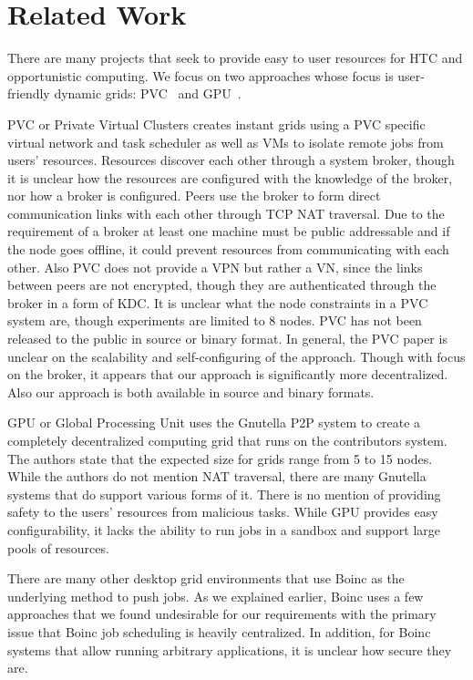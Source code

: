 \documentclass{sig-alternate}
\begin{document}
\section{Related Work}
\label{related_work}
There are many projects that seek to provide easy to user resources for HTC
and opportunistic computing.  We focus on two approaches whose focus is
user-friendly dynamic grids: PVC~\cite{pvc} and GPU~\cite{gpu}.

PVC or Private Virtual Clusters creates instant grids using a
PVC specific virtual network and task scheduler as well as VMs to isolate
remote jobs from users' resources.  Resources discover each other through a
system broker, though it is unclear how the resources are configured with the
knowledge of the broker, nor how a broker is configured.  Peers use the broker
to form direct communication links with each other through TCP NAT traversal.
Due to the requirement of a broker at least one machine must be public
addressable and if the node goes offline, it could prevent resources from
communicating with each other.  Also PVC does not provide a VPN but rather a
VN, since the links between peers are not encrypted, though they are
authenticated through the broker in a form of KDC.  It is unclear what the node
constraints in a PVC system are, though experiments are limited to 8 nodes.
PVC has not been released to the public in source or binary format.  In
general, the PVC paper is unclear on the scalability and self-configuring of
the approach.  Though with focus on the broker, it appears that our approach
is significantly more decentralized.  Also our approach is both available in
source and binary formats.

GPU or Global Processing Unit uses the Gnutella P2P system to create
a completely decentralized computing grid that runs on the contributors system.
The authors state that the expected size for grids range from 5 to 15 nodes.  
While the authors do not mention NAT traversal, there are many Gnutella systems
that do support various forms of it.  There is no mention of providing safety
to the users' resources from malicious tasks.  While GPU provides easy
configurability, it lacks the ability to run jobs in a sandbox and support large
pools of resources.

There are many other desktop grid environments that use Boinc as the underlying
method to push jobs.  As we explained earlier, Boinc uses a few approaches that
we found undesirable for our requirements with the primary issue that Boinc job
scheduling is heavily centralized.  In addition, for Boinc systems that allow
running arbitrary applications, it is unclear how secure they are.
\end{document}
